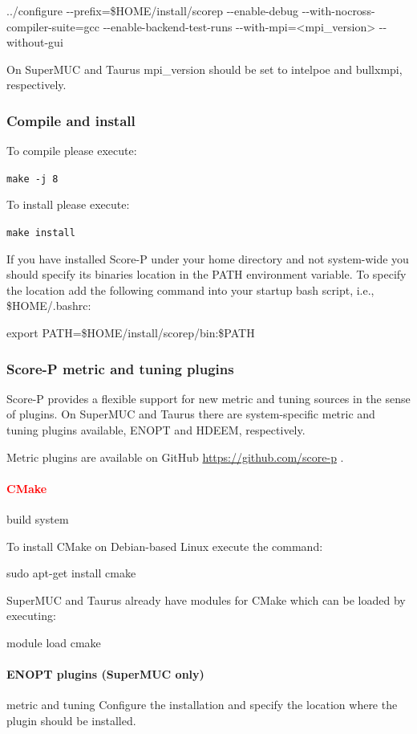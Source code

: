 \documentclass[11pt,a4paper, oneside]{book} %
\newcommand{\pluginsurl}{\url{https://github.com/score-p} }
\newcommand{\installloc}[1]{\$HOME/install/#1}
\newcommand{\ptfbrackets}[1]{\textless #1\textgreater}
\begin{document}
../configure -{}-prefix=\installloc{scorep} -{}-enable-debug
-{}-with-nocross-compiler-suite=gcc -{}-enable-backend-test-runs
-{}-with-mpi=\ptfbrackets{mpi\_version} -{}-without-gui

On SuperMUC and Taurus mpi\_version should be set to intelpoe and bullxmpi, respectively.

\subsubsection{Compile and install}

To compile please execute:

\texttt{make -j 8}


To install please execute:

\texttt{make install}

If you have installed Score-P under your home directory and not system-wide you
should specify its binaries location in the PATH environment variable. To
specify the location add the following command into your startup bash script,
i.e., \$HOME/.bashrc:

export PATH=\installloc{scorep/bin}:\$PATH

\subsubsection{Score-P metric and tuning plugins}

Score-P provides a flexible support for new metric and tuning sources in the
sense of plugins. On SuperMUC and Taurus there are system-specific metric and
tuning plugins available, ENOPT and HDEEM, respectively.

Metric plugins are available on GitHub \pluginsurl.

\paragraph{\textcolor{red}{CMake}} build system

To install CMake on Debian-based Linux execute the command:

sudo apt-get install cmake

SuperMUC and Taurus already have modules for CMake which can be loaded by
executing:

module load cmake

\paragraph{ENOPT plugins (SuperMUC only)} metric and tuning
Configure the installation and specify the location where the plugin should be
installed.
\end{document}
